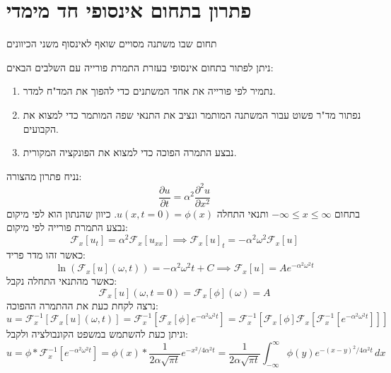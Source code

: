 \documentclass{tstextbook}
\begin{document}
\section{פתרון בתחום אינסופי חד מימדי}

\begin{definition}
תחום שבו משתנה מסויים שואף לאינסוף משני הכיוונים

\end{definition}
\begin{proposition}
ניתן לפתור בתחום אינסופי בעזרת התמרת פורייה עם השלבים הבאים:

  \begin{enumerate}
    \item נתמיר לפי פורייה את אחד המשתנים כדי להפוך את המד"ח למדר. 


    \item נפתור מד"ר פשוט עבור המשתנה המותמר ונציב את התנאי שפה המותמר כדי למצוא את הקבועים. 


    \item נבצע התמרה הפוכה כדי למצוא את הפונקציה המקורית. 


  \end{enumerate}
\end{proposition}
\begin{example}
נניח פתרון מהצורה:
$$\frac{\partial u}{\partial t} =\alpha^{2}\frac{\partial^{2}u}{\partial x^{2}} $$
בתחום \(-\infty \leq x\leq \infty\) ותנאי התחלה \(u(x,t=0)=\phi(x)\). כיוון שהנתון הוא לפי מיקום נבצע התמרת פורייה לפי מיקום:
$$\mathcal{F} _{x}[u_{t}]=\alpha^{2}\mathcal{F} _{x}[u_{x x}]\implies \mathcal{F} _{x}[u]_{t}=-\alpha^{2}\omega^{2}\mathcal{F} _{x}[u]$$
כאשר זהו מדר פריד:
$$\ln\left( \mathcal{F} _{x}[u]\left( \omega,t \right) \right)=-\alpha^{2}\omega^{2}t+C\implies \mathcal{F} _{x}[u]=Ae^{ -\alpha^{2}\omega^{2}t }$$
כאשר מהתנאי התחלה נקבל:
$$\mathcal{F} _{x}[u]\left( \omega,t =0\right)=\mathcal{F} _{x}\left[ \phi \right]\left( \omega \right)=A$$
נרצה לקחת כעת את ההתמרה ההפוכה:
$$u=\mathcal{F} _{x}^{-1}\left[ \mathcal{F} _{x}[u]\left( \omega,t \right) \right]=\mathcal{F}^{-1} _{x}\left[ \mathcal{F} _{x}\left[ \phi \right]e^{ -\alpha^{2}\omega^{2}t } \right]=\mathcal{F} _{x}^{-1}\left[ \mathcal{F} _{x}\left[ \phi \right]\mathcal{F} _{x}\left[ \mathcal{F} _{x}^{-1}\left[ e^{ -\alpha^{2}\omega^{2}t } \right] \right] \right]$$
וניתן כעת להשתמש במשפט הקונבולציה ולקבל:
$$u=\phi * \mathcal{F} _{x}^{-1}\left[ e^{ -\alpha^{2}\omega^{2}t } \right]=\phi(x)* \frac{1}{2\alpha \sqrt{ \pi t}}e^{ -x^{2}/4\alpha^{2}t }= \frac{1}{2\alpha \sqrt{ \pi t }}\int_{-\infty}^{\infty} \phi(y)e^{ -(x-y)^{2}/4\alpha^{2}t } \, dx $$

\end{example}
\end{document}
